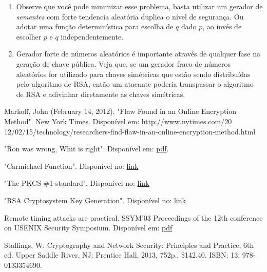\documentclass[conference]{IEEEtran}
\begin{document}
\begin{enumerate}
\begin{enumerate}
      \item Observe que você pode minimizar esse problema, basta utilizar um
      gerador de \textit{sementes} com forte tendencia aleatória duplica o nível
      de segurança. Ou adotar uma função determinística para escolha de $q$ dado
      $p$, ao invés de escolher $p$ e $q$ independentemente.
      
      \item Gerador forte de números aleatórios é importante através de qualquer
      fase na geração de chave pública. Veja que, se um gerador fraco de números
      aleatórios for utilizado para chaves simétricas que estão sendo
      distribuídas pelo algoritmo de RSA, então um atacante poderia transpassar
      o algoritmo de RSA e adivinhar diretamente as chaves simétricas.
    \end{enumerate}

\end{enumerate}

\begin{thebibliography}{1}

 Markoff, John (February 14, 2012). "Flaw Found in an Online
Encryption Method". New York Times. Disponível em: http://www.nytimes.com/20\\
12/02/15/technology/researchers-find-flaw-in-an-online-encryption-method.html

\hfil

 "Ron was wrong, Whit is right". Disponível em:
\href{http://eprint.iacr.org/2012/064.pdf}{pdf}.

\hfil

 "Carmichael Function". Disponível no:
\href{http://mathworld.wolfram.com/CarmichaelFunction.html}{link}

\hfil

 "The PKCS \#1 standard". Disponível no: 
\href{https://en.wikipedia.org/wiki/PKCS\_1#Keys}{link}

\hfil

 "RSA Cryptosystem Key Generation". Disponível no:
\href{https://en.wikipedia.org/wiki/RSA\_cryptosystem\#Key\_generation}{link}

\hfil

 Remote timing attacks are practical. SSYM'03 Proceedings of the
12th conference on USENIX Security Symposium. Disponível em:
\href{http://crypto.stanford.edu/~dabo/papers/ssl-timing.pdf}{pdf}

\hfil

 Stallings, W. Cryptography and Network Security:
Principles and Practice, 6th ed. Upper Saddle River, NJ: Prentice Hall, 2013,
752p., \$142.40. ISBN: 13: 978-0133354690.

\end{thebibliography}

\smallskip
\end{document}
